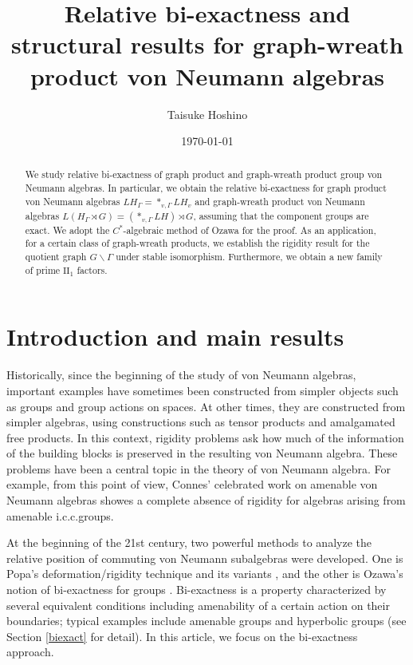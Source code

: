 \documentclass{amsart}
\theoremstyle{definition}
\newcommand{\twoone}{$\mathrm{II}_1$\xspace}
\begin{document}
\title[Relative bi-exactness for graph-wreath products]{Relative bi-exactness and structural results for graph-wreath product von Neumann algebras}
\author{Taisuke Hoshino}
\date{\today}

\begin{abstract}
We study relative bi-exactness of graph product and graph-wreath product group von Neumann algebras. 
In particular, 
we obtain the relative bi-exactness for graph product von Neumann algebras $LH_{\Gamma}=\ast_{v,\Gamma} LH_v$ and graph-wreath product von Neumann algebras $L(H_{\Gamma}\rtimes G)=(\ast_{v,\Gamma} LH)\rtimes G$, assuming that the component groups are exact. 
We adopt the $C^{\ast}$-algebraic method of Ozawa for the proof. 
As an application, for a certain class of graph-wreath products, we establish the rigidity result for the quotient graph $G\backslash\Gamma$ under stable isomorphism. 
Furthermore, we obtain a new family of prime \twoone factors. 
\end{abstract}

\maketitle



\section{Introduction and main results}

Historically, since the beginning of the study of von Neumann algebras, important examples have sometimes been constructed from simpler objects such as groups and group actions on spaces.  
At other times, they are constructed from simpler algebras, using constructions such as tensor products and amalgamated free products.
In this context, rigidity problems ask how much of the information of the building blocks is preserved in the resulting von Neumann algebra.
These problems have been a central topic in the theory of von Neumann algebra. For example,
from this point of view, Connes' celebrated work on amenable von Neumann algebras \cite{con} showes a complete absence of rigidity
for algebras arising from amenable i.c.c.\@ groups. 


At the beginning of the 21st century, two powerful methods 
to analyze the relative position of commuting von Neumann subalgebras were developed.
One is Popa's deformation/rigidity technique and its variants \cite{pop3, pop1}, 
and the other is Ozawa's notion of bi-exactness for groups \cite{oza1}.  
Bi-exactness is a property characterized by several equivalent conditions
including amenability of a certain action on their boundaries; 
typical examples include amenable groups and hyperbolic groups (see Section \ref{biexact} for detail). 
In this article, we focus on the bi-exactness approach.
\end{document}

